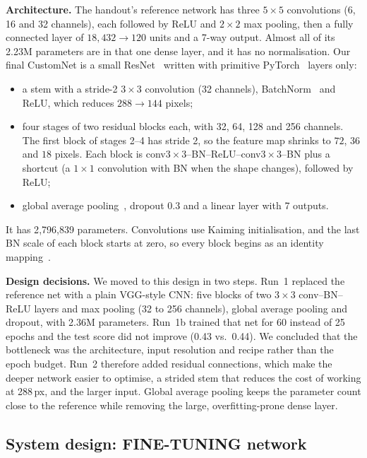 \documentclass[10pt]{article}
\begin{document}
\textbf{Architecture.} The handout's reference network has three $5\times5$ convolutions (6, 16 and 32 channels), each followed by ReLU and $2\times2$ max pooling, then a fully connected layer of $18{,}432\to120$ units and a 7-way output. Almost all of its 2.23M parameters are in that one dense layer, and it has no normalisation. Our final CustomNet is a small ResNet~\cite{he2016resnet} written with primitive PyTorch~\cite{paszke2019pytorch} layers only:
\begin{itemize}
  \item a stem with a stride-2 $3\times3$ convolution (32 channels), BatchNorm~\cite{ioffe2015batchnorm} and ReLU, which reduces $288\to144$ pixels;
  \item four stages of two residual blocks each, with 32, 64, 128 and 256 channels. The first block of stages 2--4 has stride 2, so the feature map shrinks to $72$, $36$ and $18$ pixels. Each block is conv$3\times3$--BN--ReLU--conv$3\times3$--BN plus a shortcut (a $1\times1$ convolution with BN when the shape changes), followed by ReLU;
  \item global average pooling~\cite{lin2014nin}, dropout 0.3 and a linear layer with 7 outputs.
\end{itemize}
It has 2{,}796{,}839 parameters. Convolutions use Kaiming initialisation, and the last BN scale of each block starts at zero, so every block begins as an identity mapping~\cite{goyal2017largeminibatch}.

\textbf{Design decisions.} We moved to this design in two steps. Run~1 replaced the reference net with a plain VGG-style CNN: five blocks of two $3\times3$ conv--BN--ReLU layers and max pooling (32 to 256 channels), global average pooling and dropout, with 2.36M parameters. Run~1b trained that net for 60 instead of 25 epochs and the test score did not improve (0.43 vs.\ 0.44). We concluded that the bottleneck was the architecture, input resolution and recipe rather than the epoch budget. Run~2 therefore added residual connections, which make the deeper network easier to optimise, a strided stem that reduces the cost of working at 288\,px, and the larger input. Global average pooling keeps the parameter count close to the reference while removing the large, overfitting-prone dense layer.

\subsection{System design: FINE-TUNING network}
\end{document}
